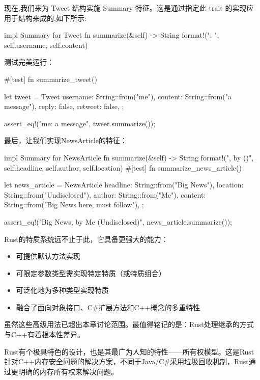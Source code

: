 现在,我们来为 Tweet 结构实施 Summary 特征。这是通过指定此 trait 的实现应用于结构来成的,如下所示:

\begin{rust}
impl Summary for Tweet {
  fn summarize(&self) -> String {
    format!("{}: {}", self.username, self.content)
  }
}
\end{rust}

测试完美运行：

\begin{rust}
#[test]
fn summarize_tweet() {
  let tweet = Tweet {
    username: String::from("me"),
    content: String::from("a message"),
    reply: false,
    retweet: false,
  };

  assert_eq!("me: a message", tweet.summarize());
}
\end{rust}

最后，让我们实现NewsArticle的特征：

\begin{rust}
impl Summary for NewsArticle {
  fn summarize(&self) -> String {
    format!("{}, by {} ({})", self.headline, self.author, self.location)
  }
}
#[test]
  fn summarize_news_article() {
    let news_article = NewsArticle {
      headline: String::from("Big News"),
      location: String::from("Undisclosed"),
      author: String::from("Me"),
      content: String::from("Big News here, must follow"),
    };

    assert_eq!("Big News, by Me (Undisclosed)", news_article.summarize());
  }
\end{rust}

Rust的特质系统远不止于此，它具备更强大的能力：

\begin{itemize}
\item 
可提供默认方法实现

\item 
可限定参数类型需实现特定特质（或特质组合）

\item 
可泛化地为多种类型实现特质

\item 
融合了面向对象接口、C\#扩展方法和C++概念的多重特性
\end{itemize}

虽然这些高级用法已超出本章讨论范围。最值得铭记的是：Rust处理继承的方式与C++有着根本性差异。


Rust有个极具特色的设计，也是其最广为人知的特性——所有权模型。这是Rust针对C++内存安全问题的解决方案，不同于Java/C\#采用垃圾回收机制，Rust通过更明确的内存所有权来解决问题。

